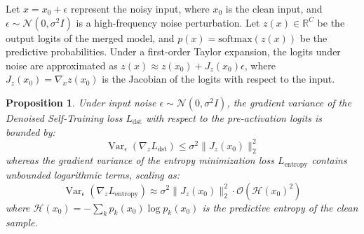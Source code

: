 \documentclass{article}
\theoremstyle{plain}
\newtheorem{proposition}[theorem]{Proposition}
\theoremstyle{definition}
\theoremstyle{remark}
\begin{document}
Let $x = x_0 + \epsilon$ represent the noisy input, where $x_0$ is the clean input, and $\epsilon \sim \mathcal{N}(0, \sigma^2 I)$ is a high-frequency noise perturbation. Let $z(x) \in \mathbb{R}^C$ be the output logits of the merged model, and $p(x) = \text{softmax}(z(x))$ be the predictive probabilities. Under a first-order Taylor expansion, the logits under noise are approximated as $z(x) \approx z(x_0) + J_z(x_0) \epsilon$, where $J_z(x_0) = \nabla_x z(x_0)$ is the Jacobian of the logits with respect to the input.

\begin{proposition}
\label{prop:variance}
Under input noise $\epsilon \sim \mathcal{N}(0, \sigma^2 I)$, the gradient variance of the Denoised Self-Training loss $L_{\text{dst}}$ with respect to the pre-activation logits is bounded by:
\begin{equation}
    \operatorname{Var}_{\epsilon} \left( \nabla_{z} L_{\text{dst}} \right) \le \sigma^2 \|J_z(x_0)\|_2^2
\end{equation}
whereas the gradient variance of the entropy minimization loss $L_{\text{entropy}}$ contains unbounded logarithmic terms, scaling as:
\begin{equation}
    \operatorname{Var}_{\epsilon} \left( \nabla_{z} L_{\text{entropy}} \right) \approx \sigma^2 \|J_z(x_0)\|_2^2 \cdot \mathcal{O}( \mathcal{H}(x_0)^2 )
\end{equation}
where $\mathcal{H}(x_0) = -\sum_k p_k(x_0) \log p_k(x_0)$ is the predictive entropy of the clean sample.
\end{proposition}
\end{document}
